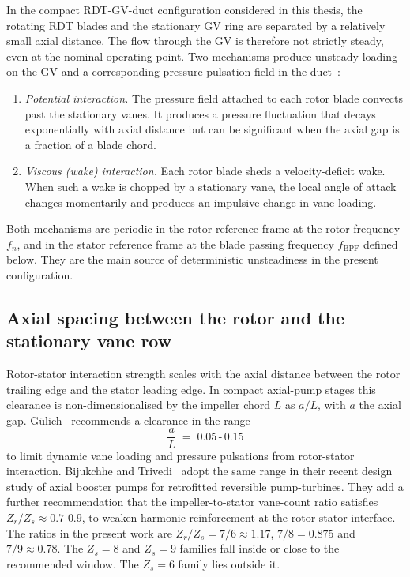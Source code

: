 In the compact RDT-GV-duct configuration considered in this thesis, the rotating RDT blades and the stationary GV ring are separated by a relatively small axial distance. The flow through the GV is therefore not strictly steady, even at the nominal operating point. Two mechanisms produce unsteady loading on the GV and a corresponding pressure pulsation field in the duct~\cite{Brekke2001, Arndt1990}:
\begin{enumerate}
  \item \emph{Potential interaction.} The pressure field attached to each rotor blade convects past the stationary vanes. It produces a pressure fluctuation that decays exponentially with axial distance but can be significant when the axial gap is a fraction of a blade chord.
  \item \emph{Viscous (wake) interaction.} Each rotor blade sheds a velocity-deficit wake. When such a wake is chopped by a stationary vane, the local angle of attack changes momentarily and produces an impulsive change in vane loading.
\end{enumerate}
Both mechanisms are periodic in the rotor reference frame at the rotor frequency $f_n$, and in the stator reference frame at the blade passing frequency $f_{\mathrm{BPF}}$ defined below. They are the main source of deterministic unsteadiness in the present configuration.

\subsection{Axial spacing between the rotor and the stationary vane row}
\label{sec:rsi-axial-spacing}

Rotor-stator interaction strength scales with the axial distance between the rotor trailing edge and the stator leading edge. In compact axial-pump stages this clearance is non-dimensionalised by the impeller chord $L$ as $a/L$, with $a$ the axial gap. G\"ulich~\cite{Gulich2010} recommends a clearance in the range
\begin{equation}
    \frac{a}{L} \;=\; 0.05\,\text{-}\,0.15
    \label{eq:gulich_a_over_L}
\end{equation}
to limit dynamic vane loading and pressure pulsations from rotor-stator interaction. Bijukchhe and Trivedi~\cite{Bijukchhe2026} adopt the same range in their recent design study of axial booster pumps for retrofitted reversible pump-turbines. They add a further recommendation that the impeller-to-stator vane-count ratio satisfies $Z_r/Z_s \approx 0.7$-$0.9$, to weaken harmonic reinforcement at the rotor-stator interface. The ratios in the present work are $Z_r/Z_s = 7/6 \approx 1.17$, $7/8 = 0.875$ and $7/9 \approx 0.78$. The $Z_s = 8$ and $Z_s = 9$ families fall inside or close to the recommended window. The $Z_s = 6$ family lies outside it.

